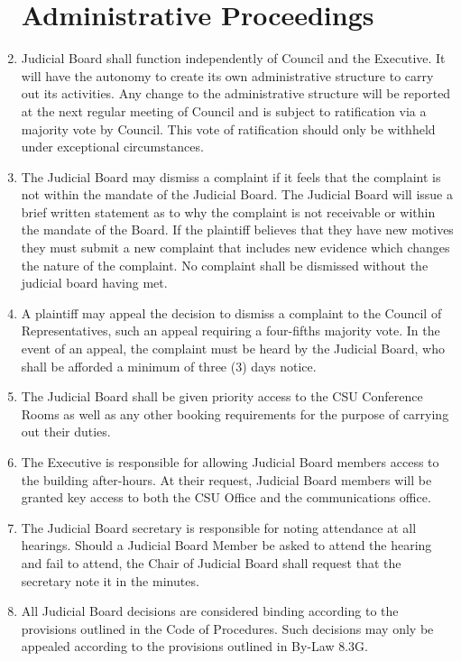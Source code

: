 \documentclass[oneside]{book}
\begin{document}
\begin{enumerate}
\section{\label{JB_Administrative_proceedings}Administrative Proceedings}
\item Judicial Board shall function independently of Council and the Executive.
It will have the autonomy to create its own administrative structure
to carry out its activities. Any change to the administrative structure
will be reported at the next regular meeting of Council and is subject to ratification 
via a majority vote by Council. This vote of ratification should only be withheld
under exceptional circumstances.
\item The Judicial Board may dismiss a complaint if it feels that the complaint is not within
the mandate of the Judicial Board. The Judicial Board will issue a brief written statement as 
to why the complaint is not receivable or within the mandate of the Board. If the plaintiff 
believes that they have new motives they must submit a new complaint that includes new evidence 
which changes the nature of the complaint. No complaint shall be dismissed without the judicial
board having met.
\item A plaintiff may appeal the decision to dismiss a complaint to the Council of Representatives, 
such an appeal requiring a four-fifths majority vote. In the event of an appeal, the complaint must 
be heard by the Judicial Board, who shall be afforded a minimum of three (3) days notice.
\item The Judicial Board shall be
given priority access to the CSU Conference Rooms as well as any other booking
requirements for the purpose of carrying out their duties.
\item The Executive is responsible for allowing Judicial Board members access
to the building after-hours. At their request, Judicial Board members will be granted key
access to both the CSU Office and the communications office.
\item The Judicial Board secretary is responsible for noting attendance at all hearings. Should a 
Judicial Board Member be asked to attend the hearing and fail to attend, the Chair of Judicial Board 
shall request that the secretary note it in the minutes.
\item All Judicial Board decisions are considered binding according to the provisions outlined
in the Code of Procedures. Such decisions may only be appealed according to the provisions
outlined in By-Law 8.3G.

\end{enumerate}
\end{document}
